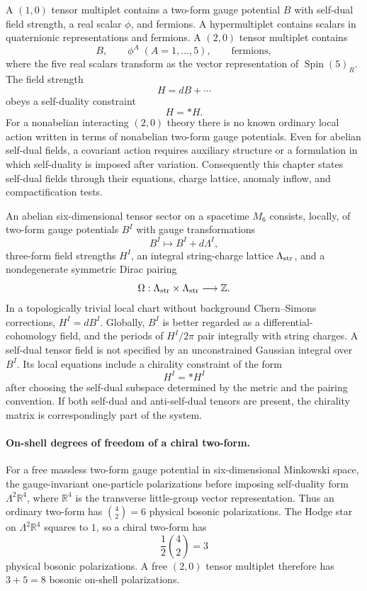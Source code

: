 A \((1,0)\) tensor multiplet contains a two-form gauge potential \(B\) with
self-dual field strength, a real scalar \(\phi\), and fermions.  A
hypermultiplet contains scalars in quaternionic representations and fermions.
A \((2,0)\) tensor multiplet contains
\[
  B,\qquad \phi^A\;(A=1,\ldots,5),\qquad \text{fermions},
\]
where the five real scalars transform as the vector representation of
\(\operatorname{Spin}(5)_R\).  The field strength
\[
  H=dB+\cdots
\]
obeys a self-duality constraint
\[
  H=*H .
\]
For a nonabelian interacting \((2,0)\) theory there is no known ordinary
local action written in terms of nonabelian two-form gauge potentials.  Even
for abelian self-dual fields, a covariant action requires auxiliary
structure or a formulation in which self-duality is imposed after variation.
Consequently this chapter states self-dual fields through their equations,
charge lattice, anomaly inflow, and compactification tests.

\begin{definition}
\label{def:six-d-abelian-self-dual-tensor-system}
An abelian six-dimensional tensor sector on a spacetime \(M_6\) consists,
locally, of two-form gauge potentials \(B^I\) with gauge transformations
\[
  B^I\longmapsto B^I+d\Lambda^I ,
\]
three-form field strengths \(H^I\), an integral string-charge lattice
\(\Lambda_{\rm str}\), and a nondegenerate symmetric Dirac pairing
\[
  \Omega:\Lambda_{\rm str}\times\Lambda_{\rm str}\longrightarrow\mathbb Z .
\]
In a topologically trivial local chart without background Chern--Simons
corrections, \(H^I=dB^I\).  Globally, \(B^I\) is better regarded as a
differential-cohomology field, and the periods of \(H^I/2\pi\) pair
integrally with string charges.  A self-dual tensor field is not specified by
an unconstrained Gaussian integral over \(B^I\).  Its local equations include
a chirality constraint of the form
\[
  H^I = *H^I
\]
after choosing the self-dual subspace determined by the metric and the
pairing convention.  If both self-dual and anti-self-dual tensors are present,
the chirality matrix is correspondingly part of the system.
\end{definition}

\paragraph{On-shell degrees of freedom of a chiral two-form.}
For a free massless two-form gauge potential in six-dimensional Minkowski
space, the gauge-invariant one-particle polarizations before imposing
self-duality form \(\Lambda^2\mathbb R^4\), where \(\mathbb R^4\) is the
transverse little-group vector representation.  Thus an ordinary two-form has
\(\binom42=6\) physical bosonic polarizations.  The Hodge star on
\(\Lambda^2\mathbb R^4\) squares to \(1\), so a chiral two-form has
\[
  \frac12\binom42=3
\]
physical bosonic polarizations.  A free \((2,0)\) tensor multiplet therefore
has \(3+5=8\) bosonic on-shell polarizations.

